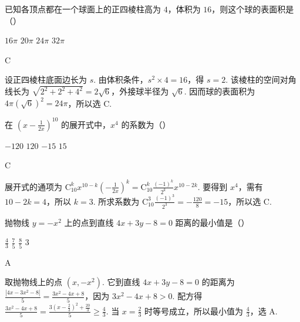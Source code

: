\begin{problem}
已知各顶点都在一个球面上的正四棱柱高为 \(4\)，体积为 \(16\)，则这个球的表面积是（\quad）

\choices
    {\(16\pi\)}
    {\(20\pi\)}
    {\(24\pi\)}
    {\(32\pi\)}
\end{problem}

\begin{answer}
C
\end{answer}

\begin{solution}
设正四棱柱底面边长为 \(s\). 由体积条件，\(s^{2}\times4=16\)，得 \(s=2\). 该棱柱的空间对角线长为 \(\sqrt{2^{2}+2^{2}+4^{2}}=2\sqrt{6}\)，外接球半径为 \(\sqrt{6}\). 因而球的表面积为 \(4\pi\left(\sqrt{6}\right)^{2}=24\pi\)，所以选 C.
\end{solution}

\begin{problem}
在 \(\left(x - \frac{1}{2x}\right)^{10}\) 的展开式中，\(x^4\) 的系数为（\quad）

\choices
    {\(-120\)}
    {\(120\)}
    {\(-15\)}
    {\(15\)}
\end{problem}

\begin{answer}
C
\end{answer}

\begin{solution}
展开式的通项为 \(\mathrm C_{10}^{k}x^{10-k}\left(-\frac{1}{2x}\right)^{k}=\mathrm C_{10}^{k}\frac{(-1)^{k}}{2^{k}}x^{10-2k}\). 要得到 \(x^{4}\)，需有 \(10-2k=4\)，所以 \(k=3\). 所求系数为 \(\mathrm C_{10}^{3}\frac{(-1)^{3}}{2^{3}}=-\frac{120}{8}=-15\)，所以选 C.
\end{solution}

\begin{problem}
抛物线 \( y = -x^{2} \) 上的点到直线 \( 4x + 3y - 8 = 0 \) 距离的最小值是（\quad）

\choices
    {\(\frac{4}{3}\)}
    {\(\frac{7}{5}\)}
    {\(\frac{8}{5}\)}
    {\(3\)}
\end{problem}

\begin{answer}
A
\end{answer}

\begin{solution}
取抛物线上的点 \(\left(x,-x^{2}\right)\). 它到直线 \(4x+3y-8=0\) 的距离为
\(\frac{|4x-3x^{2}-8|}{5}=\frac{3x^{2}-4x+8}{5}\)，因为 \(3x^{2}-4x+8>0\). 配方得
\(\frac{3x^{2}-4x+8}{5}=\frac{3\left(x-\frac{2}{3}\right)^{2}+\frac{20}{3}}{5}\geqslant\frac{4}{3}\). 当 \(x=\frac{2}{3}\) 时等号成立，所以最小值为 \(\frac{4}{3}\)，选 A.
\end{solution}

